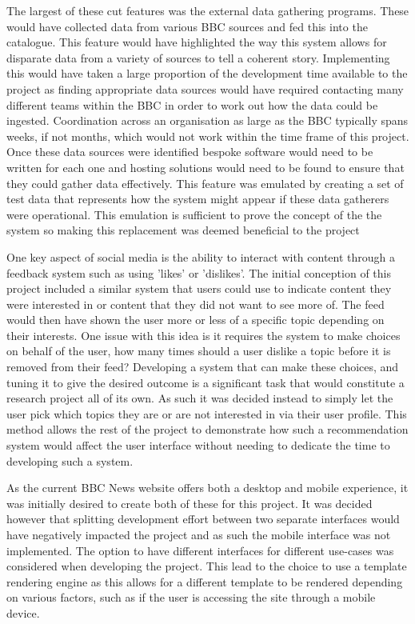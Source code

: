 \documentclass[12pt,titlepage]{article}
\begin{document}
  The largest of these cut features was the external data gathering programs.
  These would have collected data from various BBC sources and fed this into the
  catalogue. This feature would have highlighted the way this system allows for
  disparate data from a variety of sources to tell a coherent story.
  Implementing this would have taken a large proportion of the development time
  available to the project as finding appropriate data sources would have
  required contacting many different teams within the BBC in order to work out
  how the data could be ingested. Coordination across an organisation as large
  as the BBC typically spans weeks, if not months, which would not work within
  the time frame of this project. Once these data sources were identified
  bespoke software would need to be written for each one and hosting solutions
  would need to be found to ensure that they could gather data effectively. This
  feature was emulated by creating a set of test data that represents how the
  system might appear if these data gatherers were operational. This emulation
  is sufficient to prove the concept of the the system so making this
  replacement was deemed beneficial to the project

  One key aspect of social media is the ability to interact with content through
  a feedback system such as using 'likes' or 'dislikes'. The initial conception
  of this project included a similar system that users could use to indicate
  content they were interested in or content that they did not want to see more
  of. The feed would then have shown the user more or less of a specific topic
  depending on their interests. One issue with this idea is it requires the
  system to make choices on behalf of the user, how many times should a user
  dislike a topic before it is removed from their feed? Developing a system that
  can make these choices, and tuning it to give the desired outcome is a
  significant task that would constitute a research project all of its own. As
  such it was decided instead to simply let the user pick which topics they are
  or are not interested in via their user profile. This method allows the rest
  of the project to demonstrate how such a recommendation system would affect
  the user interface without needing to dedicate the time to developing such a
  system.

  As the current BBC News website offers both a desktop and mobile experience,
  it was initially desired to create both of these for this project. It was
  decided however that splitting development effort between two separate
  interfaces would have negatively impacted the project and as such the mobile
  interface was not implemented. The option to have different interfaces for
  different use-cases was considered when developing the project. This lead to
  the choice to use a template rendering engine as this allows for a different
  template to be rendered depending on various factors, such as if the user is
  accessing the site through a mobile device.
\end{document}
